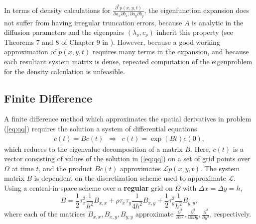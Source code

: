 In terms of density calculations for
$\frac{\partial^4 p(x,y,t)}{\partial a_x \partial b_x, \partial
  a_y \partial b_y}$, the eigenfunction expansion does not suffer from
having irregular truncation errors, because $A$ is analytic in the
diffusion parameters and the eigenpairs $(\lambda_\nu, c_\nu)$ inherit
this property (see Theorems 7 and 8 of Chapter 9 in
\cite{lax2007linear-algebra}). However, because a good working
approximation of $p(x,y,t)$ requires many terms in the expansion, and
because each resultant system matrix is dense, repeated computation of
the eigenproblem for the density calculation is unfeasible.

\subsection{Finite Difference} \label{sec:finite-difference} A finite
difference method which approximates the spatial derivatives in
problem (\ref{eq:qq}) requires the solution a system of differential
equations
\begin{align}
  \dot{c}(t)= B c(t) &\Rightarrow& c(t) = \exp\left( Bt \right)c(0) \label{eq:eigenproblem-fd}, 
\end{align}
which reduces to the eigenvalue decomposition of a matrix $B$. Here,
$c(t)$ is a vector consisting of values of the solution in
(\ref{eq:qq}) on a set of grid points over $\Omega$ at time $t$, and
the product $Bc(t)$ approximates $\mathcal{L}p(x,y,t)$. The system
matrix $B$ is dependent on the discretization scheme used to
approximate $\mathcal{L}$. Using a central-in-space scheme over a
\textbf{regular} grid on $\Omega$ with $\Delta x = \Delta y = h$,
\[ B = \frac{1}{2}\tau_x^2 \frac{1}{h^2}B_{x,x} +
  \rho\tau_x\tau_y \frac{1}{4h^2}B_{x,y} + \frac{1}{2}\tau_y^2
  \frac{1}{h^2}B_{y,y},
\]
where each of the matrices $B_{x,x}, B_{x,y}, B_{y,y}$ approximate
$\frac{\partial^2}{\partial x^2}, \frac{\partial^2}{\partial
  x \partial y}, \frac{\partial^2}{\partial y^2}$, respectively.
